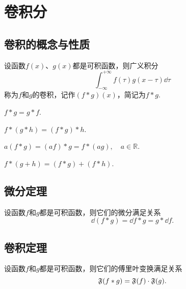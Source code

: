 
\chapter{卷积分}

\section{卷积的概念与性质}
\begin{definition}
设函数\(f(x)\)、\(g(x)\)都是可积函数，则广义积分\begin{equation*}
\int_{-\infty}^{+\infty} f(\tau) g(x - \tau) \dd{\tau}
\end{equation*}称为\(f\)和\(g\)的卷积，记作\((f * g)(x)\)，简记为\(f*g\).
\end{definition}

\begin{property}[交换律]
\(f*g = g*f\).
\end{property}

\begin{property}[结合律 I]
\(f*(g*h) = (f*g)*h\).
\end{property}

\begin{property}[结合律 II]
\(a (f*g) = (a f)*g = f*(a g), \quad a \in \mathbb{R}\).
\end{property}

\begin{property}[分配律]
\(f*(g+h)=(f*g)+(f*h)\).
\end{property}

\section{微分定理}
\begin{theorem}
设函数\(f\)和\(g\)都是可积函数，则它们的微分满足关系\begin{equation*}
\dd(f*g) = \dd{f}*g = g*\dd{f}.
\end{equation*}
\end{theorem}

\section{卷积定理}
\begin{theorem}
设函数\(f\)和\(g\)都是可积函数，则它们的傅里叶变换满足关系\begin{equation*}
\mathfrak{F}(f*g) = \mathfrak{F}(f) \cdot \mathfrak{F}(g).
\end{equation*}
\end{theorem}
